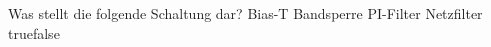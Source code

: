     {Was stellt die folgende Schaltung dar? }
    {Bias-T}
    {Bandsperre}
    {PI-Filter}
    {Netzfilter}
    {true}{false}